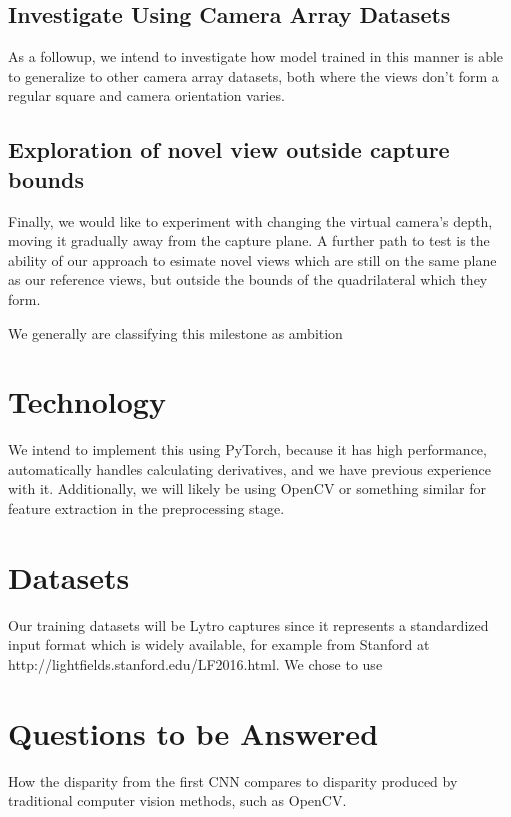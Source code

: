 \documentclass[10pt,twocolumn,letterpaper]{article}
\begin{document}
\subsection{Investigate Using Camera Array Datasets}

As a followup, we intend to investigate how model trained in this manner is
able to generalize to other camera array datasets, both where the views don't form
a regular square and camera orientation varies.

\subsection{Exploration of novel view outside capture bounds}

Finally, we would like to experiment with changing the virtual camera's depth, moving it gradually
away from the capture plane. A further path to test is the ability of our approach to esimate novel
views which are still on the same plane as our reference views, but outside the bounds of the
quadrilateral which they form.

We generally are classifying this milestone as ambition

\section{Technology}

We intend to implement this using PyTorch, because it has high performance, 
automatically handles calculating derivatives, and we have previous experience with it.
Additionally, we will likely be using OpenCV or something similar for feature extraction
in the preprocessing stage.

\section{Datasets}

Our training datasets will be Lytro captures since it represents a standardized input format which is
widely available, for example from Stanford at http://lightfields.stanford.edu/LF2016.html. We chose
to use 

\section{Questions to be Answered}

How the disparity from the first CNN compares to disparity produced 
by traditional computer vision methods, such as OpenCV.

{\small


}
\end{document}
